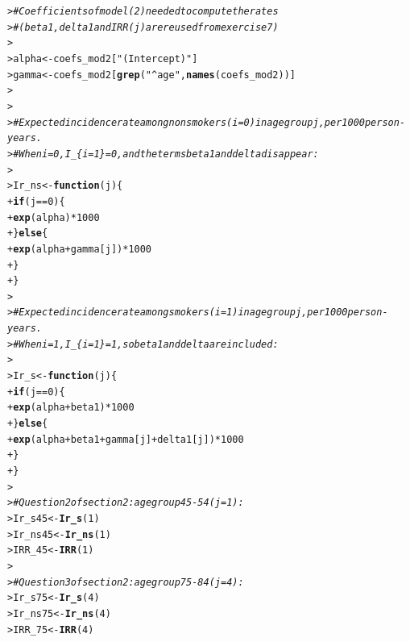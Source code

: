 \documentclass[a4paper,10pt]{article}\usepackage[]{graphicx}\usepackage[]{xcolor}
\makeatletter
\newcommand{\hlnum}[1]{\textcolor[rgb]{0.686,0.059,0.569}{#1}}%
\newcommand{\hlsng}[1]{\textcolor[rgb]{0.192,0.494,0.8}{#1}}%
\newcommand{\hlcom}[1]{\textcolor[rgb]{0.678,0.584,0.686}{\textit{#1}}}%
\newcommand{\hlopt}[1]{\textcolor[rgb]{0,0,0}{#1}}%
\newcommand{\hldef}[1]{\textcolor[rgb]{0.345,0.345,0.345}{#1}}%
\newcommand{\hlkwa}[1]{\textcolor[rgb]{0.161,0.373,0.58}{\textbf{#1}}}%
\newcommand{\hlkwb}[1]{\textcolor[rgb]{0.69,0.353,0.396}{#1}}%
\newcommand{\hlkwc}[1]{\textcolor[rgb]{0.333,0.667,0.333}{#1}}%
\newcommand{\hlkwd}[1]{\textcolor[rgb]{0.737,0.353,0.396}{\textbf{#1}}}%
\newenvironment{kframe}{%
 \def\at@end@of@kframe{}%
 \ifinner\ifhmode%
  \def\at@end@of@kframe{\end{minipage}}%
  \begin{minipage}{\columnwidth}%
 \fi\fi%
 \def\FrameCommand##1{\hskip\@totalleftmargin \hskip-\fboxsep
 \colorbox{shadecolor}{##1}\hskip-\fboxsep
     \hskip-\linewidth \hskip-\@totalleftmargin \hskip\columnwidth}%
 \MakeFramed {\advance\hsize-\width
   \@totalleftmargin\z@ \linewidth\hsize
   \@setminipage}}%
 {\par\unskip\endMakeFramed%
 \at@end@of@kframe}
\newenvironment{knitrout}{}{} %
\makeatother
\begin{document}
\begin{enumerate}
\begin{knitrout}\footnotesize
{}\color{fgcolor}\begin{kframe}
\begin{alltt}
\hldef{> }\hlcom{# Coefficients of model (2) needed to compute the rates}
\hldef{> }\hlcom{# (beta1, delta1 and IRR(j) are reused from exercise 7)}
\hldef{> }
\hldef{> }\hldef{alpha} \hlkwb{<-} \hldef{coefs_mod2[}\hlsng{"(Intercept)"}\hldef{]}
\hldef{> }\hldef{gamma} \hlkwb{<-} \hldef{coefs_mod2[}\hlkwd{grep}\hldef{(}\hlsng{"^age"}\hldef{,} \hlkwd{names}\hldef{(coefs_mod2))]}
\hldef{> }
\hldef{> }
\hldef{> }\hlcom{# Expected incidence rate among nonsmokers (i=0) in age group j, per 1000 person-years. }
\hldef{> }\hlcom{# When i = 0, I_\{i=1\} = 0, and the terms beta1 and delta disappear:}
\hldef{> }
\hldef{> }\hldef{Ir_ns} \hlkwb{<-} \hlkwa{function}\hldef{(}\hlkwc{j}\hldef{)\{}
\hldef{+ }  \hlkwa{if} \hldef{(j} \hlopt{==} \hlnum{0}\hldef{)\{}
\hldef{+ }    \hlkwd{exp}\hldef{(alpha)} \hlopt{*} \hlnum{1000}
\hldef{+ }  \hldef{\}} \hlkwa{else} \hldef{\{}
\hldef{+ }    \hlkwd{exp}\hldef{(alpha} \hlopt{+} \hldef{gamma[j])} \hlopt{*} \hlnum{1000}
\hldef{+ }  \hldef{\}}
\hldef{+ }\hldef{\}}
\hldef{> }
\hldef{> }\hlcom{# Expected incidence rate among smokers (i=1) in age group j, per 1000 person-years. }
\hldef{> }\hlcom{# When i = 1, I_\{i=1\} = 1, so beta1 and delta are included:}
\hldef{> }
\hldef{> }\hldef{Ir_s} \hlkwb{<-} \hlkwa{function}\hldef{(}\hlkwc{j}\hldef{)\{}
\hldef{+ }  \hlkwa{if} \hldef{(j} \hlopt{==} \hlnum{0}\hldef{)\{}
\hldef{+ }    \hlkwd{exp}\hldef{(alpha} \hlopt{+} \hldef{beta1)} \hlopt{*} \hlnum{1000}
\hldef{+ }  \hldef{\}} \hlkwa{else} \hldef{\{}
\hldef{+ }    \hlkwd{exp}\hldef{(alpha} \hlopt{+} \hldef{beta1} \hlopt{+} \hldef{gamma[j]} \hlopt{+} \hldef{delta1[j])} \hlopt{*} \hlnum{1000}
\hldef{+ }  \hldef{\}}
\hldef{+ }\hldef{\}}
\hldef{> }
\hldef{> }\hlcom{# Question 2 of section 2: age group 45-54 (j=1):}
\hldef{> }\hldef{Ir_s45} \hlkwb{<-} \hlkwd{Ir_s}\hldef{(}\hlnum{1}\hldef{)}
\hldef{> }\hldef{Ir_ns45} \hlkwb{<-} \hlkwd{Ir_ns}\hldef{(}\hlnum{1}\hldef{)}
\hldef{> }\hldef{IRR_45} \hlkwb{<-} \hlkwd{IRR}\hldef{(}\hlnum{1}\hldef{)}
\hldef{> }
\hldef{> }\hlcom{# Question 3 of section 2: age group 75-84 (j=4):}
\hldef{> }\hldef{Ir_s75} \hlkwb{<-} \hlkwd{Ir_s}\hldef{(}\hlnum{4}\hldef{)}
\hldef{> }\hldef{Ir_ns75} \hlkwb{<-} \hlkwd{Ir_ns}\hldef{(}\hlnum{4}\hldef{)}
\hldef{> }\hldef{IRR_75} \hlkwb{<-} \hlkwd{IRR}\hldef{(}\hlnum{4}\hldef{)}
\end{alltt}
\end{kframe}
\end{knitrout}


\end{enumerate}
\end{document}
